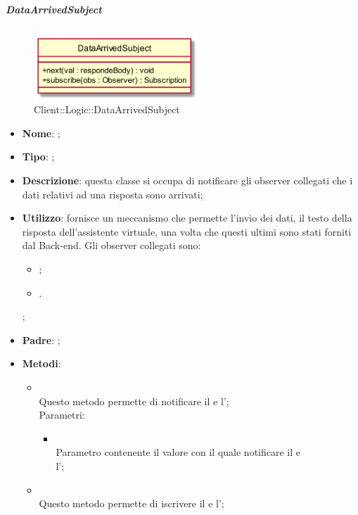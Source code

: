\hypertarget{DataArrivedSubject_label}{\subparagraph{DataArrivedSubject}}
\begin{figure}[h]
	\centering
	\includegraphics[width=0.55\textwidth,height=\textheight,keepaspectratio]{images/ClassDataArrivedSubject.png}
	\caption{Client::Logic::DataArrivedSubject}
\end{figure}
\begin{itemize}
	\item \textbf{Nome}: ;
	\item \textbf{Tipo}: ;
	\item \textbf{Descrizione}: questa classe si occupa di notificare gli observer collegati che i dati relativi ad una risposta sono arrivati;
	\item \textbf{Utilizzo}: fornisce un meccanismo che permette l'invio dei dati, il testo della risposta dell'assistente virtuale, una volta che questi ultimi sono stati forniti dal Back-end.
Gli observer collegati sono:
\begin{itemize}
\item {};
\item {}.
\end{itemize};
	\item \textbf{Padre}: ;
	\item \textbf{Metodi}:
	\begin{itemize}
		\item[]  \\		Questo metodo permette di notificare il  e l';\\
		Parametri:
		\begin{itemize}
			\item {} \\
			Parametro contenente il valore con il quale notificare il  e \\ l';
		\end{itemize}
		\item[]  \\		Questo metodo permette di iscrivere il  e l';\\

\end{itemize}
\end{itemize}
